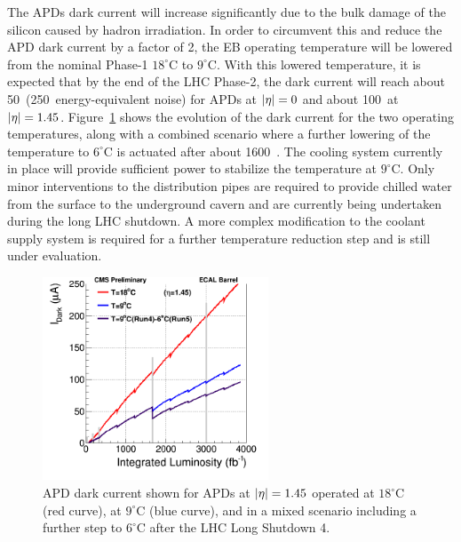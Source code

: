 The APDs dark current will increase significantly due to the bulk damage of the silicon caused by hadron irradiation. In order to circumvent this and reduce the APD dark current by a factor of 2, the EB operating temperature will be lowered from the nominal Phase-1 $18^\circ \text{C}$ to $9^\circ \text{C}$. With this lowered temperature, it is expected that by the end of the LHC Phase-2, the dark current will reach about 50~\mua (250~\MeV energy-equivalent noise) for APDs at $\lvert\eta\rvert = 0$ and about 100~\mua at $\lvert\eta\rvert = 1.45$. Figure~\ref{fig:APD} shows the evolution of the dark current for the two operating temperatures, along with a combined scenario where a further lowering of the temperature to $6^\circ \text{C}$ is actuated after about 1600~\fb. The cooling system currently in place will provide sufficient power to stabilize the temperature at $9^\circ \text{C}$. Only minor interventions to the distribution pipes are required to provide chilled water from the surface to the underground cavern and are currently being undertaken during the long LHC shutdown. A more complex modification to the coolant supply system is required for a further temperature reduction step and is still under evaluation.

\begin{figure}[htbp]
  \centering
  \includegraphics[width=0.6\textwidth]{plots/chapter3/APD.png}
  \caption{APD dark current shown for APDs at $\lvert\eta\rvert = 1.45$ operated at $18^\circ \text{C}$ (red curve), at $9^\circ \text{C}$ (blue curve), and in a mixed scenario including a further step to $6^\circ \text{C}$ after the LHC Long Shutdown 4.}
  \label{fig:APD}
\end{figure}

